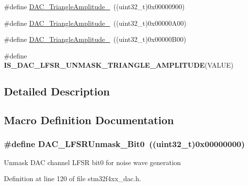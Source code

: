 \begin{DoxyCompactItemize}
\item 
\#define \hyperlink{group___d_a_c__lfsrunmask__triangleamplitude_ga7d573b0cebb1b939bd83367effb93d89}{D\-A\-C\-\_\-\-Triangle\-Amplitude\-\_}~((uint32\-\_\-t)0x00000900)
\item 
\#define \hyperlink{group___d_a_c__lfsrunmask__triangleamplitude_gad33d28d7fcc09d84500ea9b6e6c5feed}{D\-A\-C\-\_\-\-Triangle\-Amplitude\-\_}~((uint32\-\_\-t)0x00000\-A00)
\item 
\#define \hyperlink{group___d_a_c__lfsrunmask__triangleamplitude_ga3ce69f5a63a2464dc4b5f73cb6fe72f5}{D\-A\-C\-\_\-\-Triangle\-Amplitude\-\_}~((uint32\-\_\-t)0x00000\-B00)
\item 
\#define {\bfseries I\-S\-\_\-\-D\-A\-C\-\_\-\-L\-F\-S\-R\-\_\-\-U\-N\-M\-A\-S\-K\-\_\-\-T\-R\-I\-A\-N\-G\-L\-E\-\_\-\-A\-M\-P\-L\-I\-T\-U\-D\-E}(V\-A\-L\-U\-E)
\end{DoxyCompactItemize}


\subsection{Detailed Description}


\subsection{Macro Definition Documentation}
\hypertarget{group___d_a_c__lfsrunmask__triangleamplitude_ga60794fd5092a332cfa82e1cee13945fc}{
\subsubsection[{D\-A\-C\-\_\-\-L\-F\-S\-R\-Unmask\-\_\-\-Bit0}]{\setlength{\rightskip}{0pt plus 5cm}\#define D\-A\-C\-\_\-\-L\-F\-S\-R\-Unmask\-\_\-\-Bit0~((uint32\-\_\-t)0x00000000)}}\label{group___d_a_c__lfsrunmask__triangleamplitude_ga60794fd5092a332cfa82e1cee13945fc}
Unmask D\-A\-C channel L\-F\-S\-R bit0 for noise wave generation 

Definition at line 120 of file stm32f4xx\-\_\-dac.\-h.

